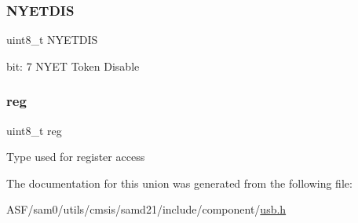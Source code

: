 \subsubsection{\texorpdfstring{NYETDIS}{NYETDIS}}
{\footnotesize\ttfamily uint8\+\_\+t N\+Y\+E\+T\+D\+IS}

bit\+: 7 N\+Y\+ET Token Disable \mbox{\label{union_u_s_b___d_e_v_i_c_e___e_p_c_f_g___type_a9428adc9af4653a2050e2536b55dec8d}} 
\subsubsection{\texorpdfstring{reg}{reg}}
{\footnotesize\ttfamily uint8\+\_\+t reg}

Type used for register access 

The documentation for this union was generated from the following file\+:\begin{DoxyCompactItemize}
\item 
A\+S\+F/sam0/utils/cmsis/samd21/include/component/\mbox{\hyperlink{component_2usb_8h}{usb.\+h}}\end{DoxyCompactItemize}
